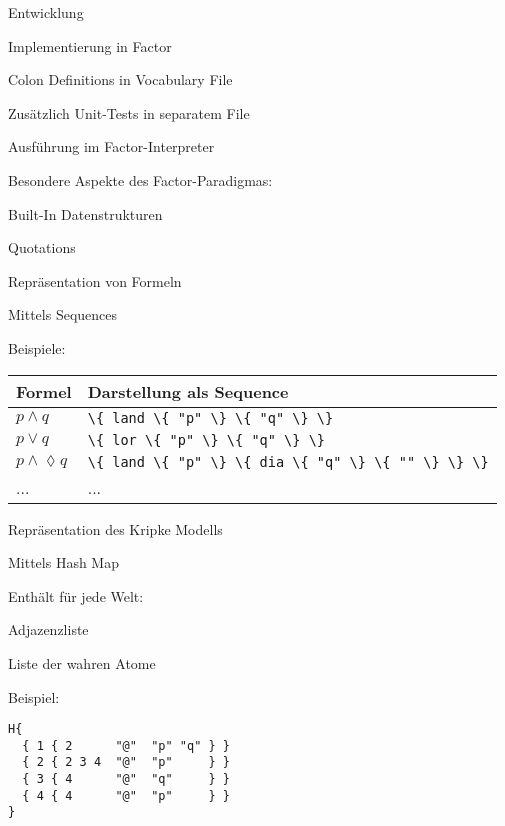 \begin{frame}{Entwicklung}
\bi
  \item Implementierung in Factor
  \item Colon Definitions in Vocabulary File
  \item Zus\"atzlich Unit-Tests in separatem File
  \item Ausf\"uhrung im Factor-Interpreter
  \item Besondere Aspekte des Factor-Paradigmas:
  \bi
    \item Built-In Datenstrukturen
    \item Quotations
  \ei
\ei
\end{frame}

\begin{frame}{Repr\"asentation von Formeln}
\bi
  \item Mittels Sequences
  \item Beispiele:
\ei

\begin{center}
\begin{tabular}{l|l}
Formel & Darstellung als Sequence \\
\hline
$p \wedge q$ & \lstinline!\{ land \{ "p" \} \{ "q" \} \}! \\
$p \vee q$ & \lstinline!\{ lor \{ "p" \} \{ "q" \} \}! \\
$p \wedge \lozenge q$ & \lstinline!\{ land \{ "p" \} \{ dia \{ "q" \} \{ "" \} \} \}! \\
... & ...
\end{tabular}
\end{center}
\end{frame}

\begin{frame}[fragile]{Repr\"asentation des Kripke Modells}
\bi
  \item Mittels Hash Map
  \item Enth\"alt f\"ur jede Welt:
  \bi
    \item Adjazenzliste
    \item Liste der wahren Atome
  \ei
  \item Beispiel:
\ei

\begin{lstlisting}[xleftmargin=50pt]
H{
  { 1 { 2      "@"  "p" "q" } }
  { 2 { 2 3 4  "@"  "p"     } }
  { 3 { 4      "@"  "q"     } }
  { 4 { 4      "@"  "p"     } }
}
\end{lstlisting}
\end{frame}

\begin{frame}[c,allowframebreaks]
\begin{center}
\Huge
{}
\end{center}
\end{frame}